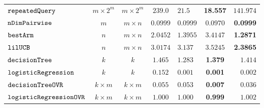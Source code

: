 {\begin {table}[t]
\begin{center}
{\begin{tabular}{|| >{\tiny}l || c | c || c || l | c | r ||  }
         \hhline{||-||--||-||---||}
         $\mathtt{repeatedQuery}$~\cite{Jamieson2015TheAO} & $ m \times 2^m $ & $  m \times 2^m $ & $239.0$   & $21.5$ & {\textbf{18.557}} & $141.974$  \\
         \hhline{||-||--||-||---||}
         $\mathtt{nDimPairwise}$~\cite{Jamieson2015TheAO} & $ m $ & $  m \times n  $ & $0.0999$   & $0.0999$ & $0.0970$ & \textbf{0.0999}  \\
         \hhline{||-||--||-||---||}
         $\mathtt{bestArm}$~\cite{Jamieson2015TheAO} & $ n $ & $  m \times n $ & $ 2.0452$   & $ 1.3955$ & {{$3.4147$}} & \textbf{1.2871}  \\
         \hhline{||-||--||-||---||}
         $\mathtt{lilUCB}$~\cite{Jamieson2015TheAO} & $ n $ & $ m \times n $ & $3.0174$   & $ 3.137$ & {$3.5245$} & \textbf{2.3865}  \\
         \hhline{||-||--||-||---||}
         $\mathtt{decisionTree}$ & $k$ &  $k$ & $ 1.465$  & $ 1.283$ & \textbf{1.379 } & {$1.414$}  \\
         \hhline{||-||--||-||---||}
         $  \mathtt{logisticRegression}$ & $k$ &  $k$ & $ 0.152$  &  $ 0.001$ & {\textbf{0.001}} & {$0.002$}   \\
        \hhline{||-||--||-||---||}
        $  \mathtt{decisionTreeOVR}$ & $k \times m$ &  $ k \times m $ &  $0.055$ & $0.053$  &  {\textbf{0.007}} & $0.036$  \\
        \hhline{||-||--||-||---||}
        $  \mathtt{logisticRegressionOVR}$    & $k \times m$ &  $ k \times m $ &  $ 1.000  $  &  $ 1.000 $ & {\textbf{ 0.999}} & $ 1.002 $ \\

\end{tabular}}
\end{center}
\end{table}}
